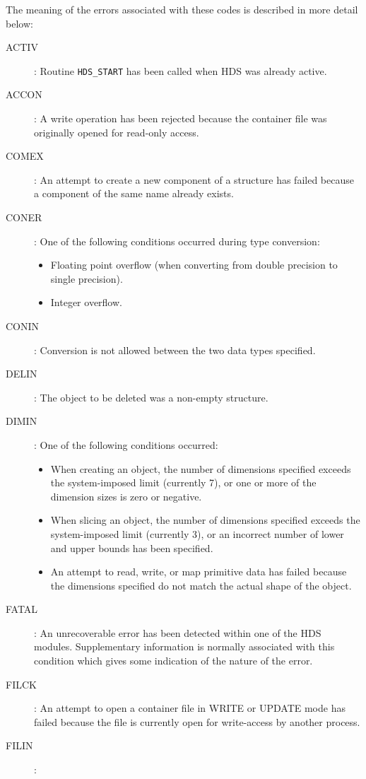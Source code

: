 The meaning of the errors associated with these codes is described in more
detail below:

\begin{description}
\item [ACTIV]:
Routine {\tt HDS\_START} has been called when HDS was already active.
\item [ACCON]:
A write operation has been rejected because the container file was originally
opened for read-only access.
\item [COMEX]:      
An attempt to create a new component of a structure has failed because a
component of the same name already exists.
\item [CONER]:
One of the following conditions occurred during type conversion:
\begin{itemize}
\item Floating point overflow (when converting from double precision to single
precision).
\item Integer overflow.
\end{itemize}
\item [CONIN]:
Conversion is not allowed between the two data types specified.
\item [DELIN]:
The object to be deleted was a non-empty structure.
\item [DIMIN]:
One of the following conditions occurred:
\begin{itemize}
\item When creating an object, the number of dimensions specified exceeds the
system-imposed limit (currently 7), or one or more of the dimension sizes is
zero or negative.
\item When slicing an object, the number of dimensions specified exceeds the
system-imposed limit (currently 3), or an incorrect number of lower and upper
bounds has been specified.
\item An attempt to read, write, or map primitive data has failed because the
dimensions specified do not match the actual shape of the object.
\end{itemize}
\item [FATAL]:
An unrecoverable error has been detected within one of the HDS modules.
Supplementary information is normally associated with this condition which gives
some indication of the nature of the error.
\item [FILCK]:
An attempt to open a container file in WRITE or UPDATE mode has failed
because the file is currently open for write-access by another process.
\item [FILIN]:

\end{description}
